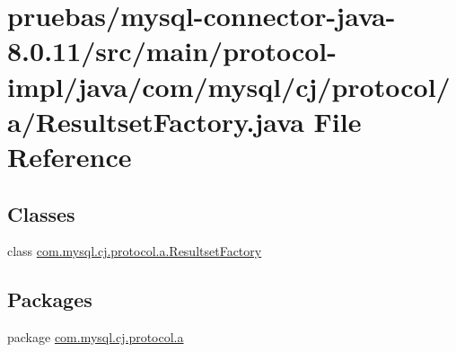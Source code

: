 \hypertarget{protocol-impl_2java_2com_2mysql_2cj_2protocol_2a_2_resultset_factory_8java}{}\section{pruebas/mysql-\/connector-\/java-\/8.0.11/src/main/protocol-\/impl/java/com/mysql/cj/protocol/a/\+Resultset\+Factory.java File Reference}
\label{protocol-impl_2java_2com_2mysql_2cj_2protocol_2a_2_resultset_factory_8java}
\subsection*{Classes}
\begin{DoxyCompactItemize}
\item 
class \mbox{\hyperlink{classcom_1_1mysql_1_1cj_1_1protocol_1_1a_1_1_resultset_factory}{com.\+mysql.\+cj.\+protocol.\+a.\+Resultset\+Factory}}
\end{DoxyCompactItemize}
\subsection*{Packages}
\begin{DoxyCompactItemize}
\item 
package \mbox{\hyperlink{namespacecom_1_1mysql_1_1cj_1_1protocol_1_1a}{com.\+mysql.\+cj.\+protocol.\+a}}
\end{DoxyCompactItemize}
